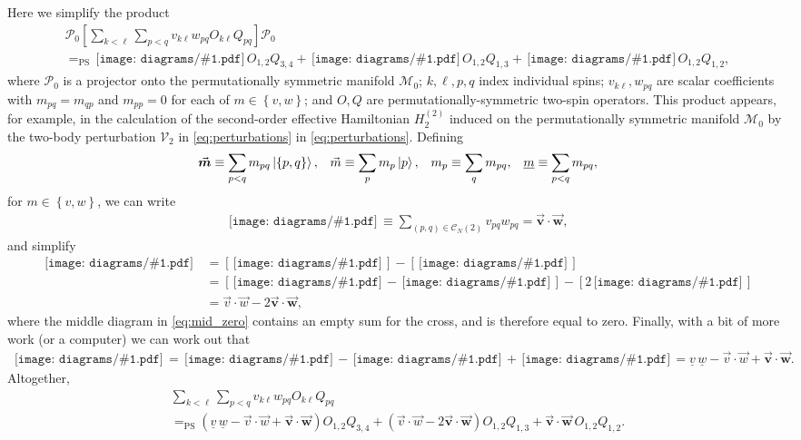\documentclass[nofootinbib,notitlepage,11pt]{revtex4-2}
\newcommand{\p}[1]{\left(#1\right)} %
\renewcommand{\sp}[1]{\left[#1\right]} %
\renewcommand{\set}[1]{\left\{#1\right\}} %
\renewcommand{\c}{\cdot} %
\newcommand{\m}{\bm} %
\renewcommand{\v}{\vec} %
\newcommand{\1}{\mathds{1}}
\newcommand{\C}{\mathcal{C}}
\newcommand{\M}{\mathcal{M}}
\renewcommand{\P}{\mathcal{P}}
\newcommand{\V}{\mathcal{V}}
\newcommand{\EQPS}{=_{\text{PS}}}
\newcommand{\col}{\underline}
\newcommand{\diagram}[1]
{\,\texttt{[image: diagrams/\#1.pdf]}\,}
\begin{document}
Here we simplify the product
\begin{multline}
  \P_0 \sp{\sum_{k<\ell} \sum_{p<q}
    v_{k\ell} w_{pq} O_{k\ell} Q_{pq}} \P_0 \\
  \EQPS \diagram{two_body_0} O_{1,2} Q_{3,4}
  + \diagram{two_body_1} O_{1,2} Q_{1,3}
  + \diagram{two_body_2} O_{1,2} Q_{1,2},
  \label{eq:POQP_start}
\end{multline}
where $\P_0$ is a projector onto the permutationally symmetric
manifold $\M_0$; $k,\ell,p,q$ index individual spins;
$v_{k\ell},w_{pq}$ are scalar coefficients with $m_{pq}=m_{qp}$ and
$m_{pp}=0$ for each of $m\in\set{v,w}$; and $O,Q$ are
permutationally-symmetric two-spin operators.  This product appears,
for example, in the calculation of the second-order effective
Hamiltonian $H_2^{(2)}$ induced on the permutationally symmetric
manifold $\M_0$ by the two-body perturbation $\V_2$ in
\eqref{eq:perturbations} in \eqref{eq:perturbations}.  Defining
\begin{align}
  \v{\m m} \equiv \sum_{p<q} m_{pq} \ket{\set{p,q}},
  &&
  \v m \equiv \sum_p m_p \ket{p},
  &&
  m_p \equiv \sum_q m_{pq},
  &&
  \col{m} \equiv \sum_{p<q} m_{pq},
\end{align}
for $m\in\set{v,w}$, we can write
\begin{align}
  \diagram{two_body_2} \equiv \sum_{\p{p,q}\in\C_N\p{2}} v_{pq} w_{pq}
  = \v{\m v} \c\v{\m w},
\end{align}
and simplify
\begin{align}
  \diagram{two_body_1}
  &= \sp{\diagram{two_body_1_o}} - \sp{\diagram{two_body_1_x}} \\
  &= \sp{\diagram{two_body_1_oo} - \diagram{two_body_1_ox}}
  - \sp{2\diagram{two_body_2}} \label{eq:mid_zero} \\
  &= \v v \c \v w - 2 \v{\m v} \c \v{\m w},
\end{align}
where the middle diagram in \eqref{eq:mid_zero} contains an empty sum
for the cross, and is therefore equal to zero.  Finally, with a bit of
more work (or a computer) we can work out that
\begin{align}
  \diagram{two_body_0}
  = \diagram{two_body_0_oooo} - \diagram{two_body_1_ooo}
  + \diagram{two_body_2_oo}
  = \col{v}\,\col{w} -\v v\c\v w + \v{\m v}\c\v{\m w}.
\end{align}
Altogether,
\begin{multline}
  \sum_{k<\ell} \sum_{p<q} v_{k\ell} w_{pq} O_{k\ell} Q_{pq} \\
  \EQPS \p{\col{v}\,\col{w} -\v v\c\v w + \v{\m v}\c\v{\m w}}
  O_{1,2} Q_{3,4}
  + \p{\v v\c\v w - 2 \v{\m v} \c \v{\m w}} O_{1,2} Q_{1,3}
  + \v{\m v} \c \v{\m w}\, O_{1,2} Q_{1,2}.
  \label{eq:POQP}
\end{multline}
\end{document}
